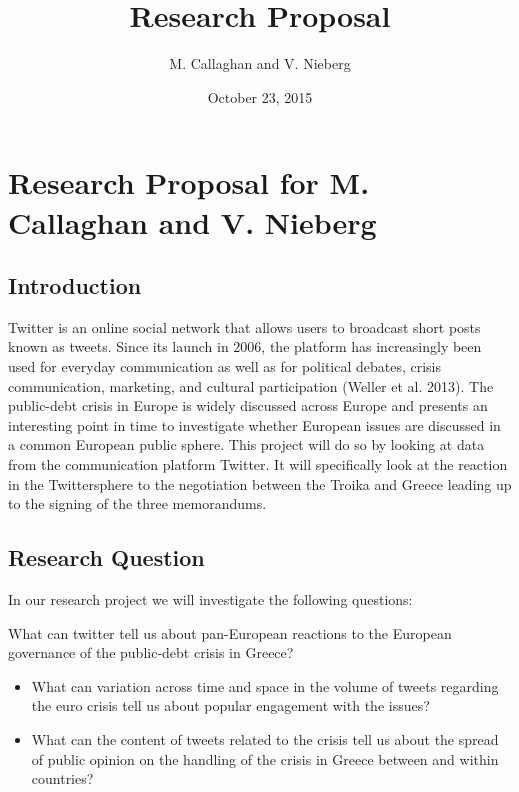 \documentclass[]{article}
\title{Research Proposal}
\author{M. Callaghan and V. Nieberg}
\date{October 23, 2015}
\begin{document}
\maketitle

\section{Research Proposal for M. Callaghan and V.
Nieberg}\label{research-proposal-for-m.-callaghan-and-v.-nieberg}

\subsection{Introduction}\label{introduction}

Twitter is an online social network that allows users to broadcast short
posts known as tweets. Since its launch in 2006, the platform has
increasingly been used for everyday communication as well as for
political debates, crisis communication, marketing, and cultural
participation (Weller et al. 2013). The public-debt crisis in Europe is
widely discussed across Europe and presents an interesting point in time
to investigate whether European issues are discussed in a common
European public sphere. This project will do so by looking at data from
the communication platform Twitter. It will specifically look at the
reaction in the Twittersphere to the negotiation between the Troika and
Greece leading up to the signing of the three memorandums.

\subsection{Research Question}\label{research-question}

In our research project we will investigate the following questions:

What can twitter tell us about pan-European reactions to the European
governance of the public-debt crisis in Greece?

\begin{itemize}
\item
  What can variation across time and space in the volume of tweets
  regarding the euro crisis tell us about popular engagement with the
  issues?
\item
  What can the content of tweets related to the crisis tell us about the
  spread of public opinion on the handling of the crisis in Greece
  between and within countries?
\end{itemize}
\end{document}
